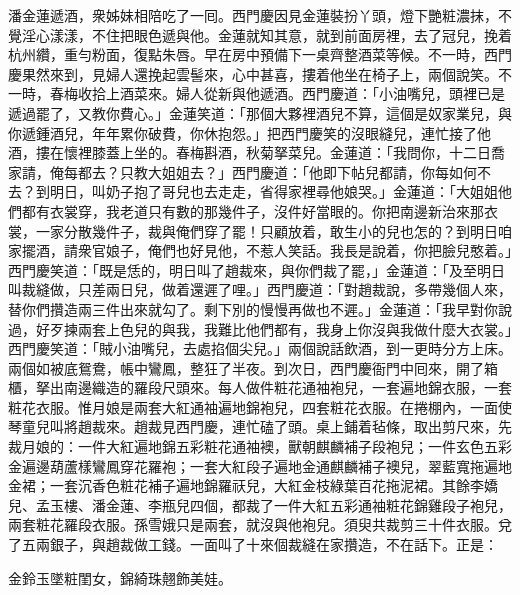 潘金蓮遞酒，衆姊妹相陪吃了一囘。西門慶因見金蓮裝扮丫頭，燈下艷粧濃抹，不覺淫心漾漾，不住把眼色遞與他。金蓮就知其意，就到前面房裡，去了冠兒，挽着杭州纘，重勻粉面，復點朱唇。早在房中預備下一桌齊整酒菜等候。不一時，西門慶果然來到，見婦人還挽起雲髻來，心中甚喜，摟着他坐在椅子上，兩個說笑。不一時，春梅收拾上酒菜來。婦人從新與他遞酒。西門慶道：「小油嘴兒，頭裡已是遞過罷了，又教你費心。」金蓮笑道：「那個大夥裡酒兒不算，這個是奴家業兒，與你遞鍾酒兒，年年累你破費，你休抱怨。」把西門慶笑的沒眼縫兒，連忙接了他酒，摟在懷裡膝蓋上坐的。春梅斟酒，秋菊拏菜兒。金蓮道：「我問你，十二日喬家請，俺每都去？只教大姐姐去？」西門慶道：「他即下帖兒都請，你每如何不去？到明日，叫奶子抱了哥兒也去走走，省得家裡尋他娘哭。」金蓮道：「大姐姐他們都有衣裳穿，我老道只有數的那幾件子，沒件好當眼的。你把南邊新治來那衣裳，一家分散幾件子，裁與俺們穿了罷！只顧放着，敢生小的兒也怎的？到明日咱家擺酒，請衆官娘子，俺們也好見他，不惹人笑話。我長是說着，你把臉兒憨着。」西門慶笑道：「既是恁的，明日叫了趙裁來，與你們裁了罷，」金蓮道：「及至明日叫裁縫做，只差兩日兒，做着還遲了哩。」西門慶道：「對趙裁說，多帶幾個人來，替你們攢造兩三件出來就勾了。剩下別的慢慢再做也不遲。」金蓮道：「我早對你說過，好歹揀兩套上色兒的與我，我難比他們都有，我身上你沒與我做什麼大衣裳。」西門慶笑道：「賊小油嘴兒，去處掐個尖兒。」兩個說話飲酒，到一更時分方上床。兩個如被底鴛鴦，帳中鸞鳳，整狂了半夜。到次日，西門慶衙門中囘來，開了箱櫃，拏出南邊織造的羅段尺頭來。每人做件粧花通袖袍兒，一套遍地錦衣服，一套粧花衣服。惟月娘是兩套大紅通袖遍地錦袍兒，四套粧花衣服。在捲棚內，一面使琴童兒叫將趙裁來。趙裁見西門慶，連忙磕了頭。桌上鋪着毡條，取出剪尺來，先裁月娘的：一件大紅遍地錦五彩粧花通袖襖，獸朝麒麟補子段袍兒；一件玄色五彩金遍邊葫蘆樣鸞鳳穿花羅袍；一套大紅段子遍地金通麒麟補子襖兒，翠藍寬拖遍地金裙；一套沉香色粧花補子遍地錦羅祆兒，大紅金枝綠葉百花拖泥裙。其餘李嬌兒、孟玉樓、潘金蓮、李瓶兒四個，都裁了一件大紅五彩通袖粧花錦雞段子袍兒，兩套粧花羅段衣服。孫雪娥只是兩套，就沒與他袍兒。須臾共裁剪三十件衣服。兌了五兩銀子，與趙裁做工錢。一面叫了十來個裁縫在家攢造，不在話下。正是：

\begin{myquote}
金鈴玉墜粧閨女，錦綺珠翹飾美娃。
\end{myquote}

